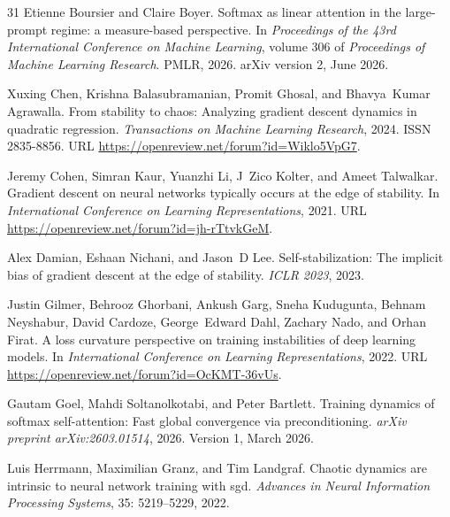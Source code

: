 \documentclass[11pt]{article}
\begin{document}
\begin{thebibliography}{31}
Etienne Boursier and Claire Boyer.
\newblock Softmax as linear attention in the large-prompt regime: a
  measure-based perspective.
\newblock In \emph{Proceedings of the 43rd International Conference on Machine
  Learning}, volume 306 of \emph{Proceedings of Machine Learning Research}.
  PMLR, 2026.
\newblock arXiv version 2, June 2026.

Xuxing Chen, Krishna Balasubramanian, Promit Ghosal, and Bhavya~Kumar
  Agrawalla.
\newblock From stability to chaos: Analyzing gradient descent dynamics in
  quadratic regression.
\newblock \emph{Transactions on Machine Learning Research}, 2024.
\newblock ISSN 2835-8856.
\newblock URL \url{https://openreview.net/forum?id=Wiklo5VpG7}.

Jeremy Cohen, Simran Kaur, Yuanzhi Li, J~Zico Kolter, and Ameet Talwalkar.
\newblock Gradient descent on neural networks typically occurs at the edge of
  stability.
\newblock In \emph{International Conference on Learning Representations}, 2021.
\newblock URL \url{https://openreview.net/forum?id=jh-rTtvkGeM}.

Alex Damian, Eshaan Nichani, and Jason~D Lee.
\newblock Self-stabilization: The implicit bias of gradient descent at the edge
  of stability.
\newblock \emph{ICLR 2023}, 2023.

Justin Gilmer, Behrooz Ghorbani, Ankush Garg, Sneha Kudugunta, Behnam
  Neyshabur, David Cardoze, George~Edward Dahl, Zachary Nado, and Orhan Firat.
\newblock A loss curvature perspective on training instabilities of deep
  learning models.
\newblock In \emph{International Conference on Learning Representations}, 2022.
\newblock URL \url{https://openreview.net/forum?id=OcKMT-36vUs}.

Gautam Goel, Mahdi Soltanolkotabi, and Peter Bartlett.
\newblock Training dynamics of softmax self-attention: Fast global convergence
  via preconditioning.
\newblock \emph{arXiv preprint arXiv:2603.01514}, 2026.
\newblock Version 1, March 2026.

Luis Herrmann, Maximilian Granz, and Tim Landgraf.
\newblock Chaotic dynamics are intrinsic to neural network training with sgd.
\newblock \emph{Advances in Neural Information Processing Systems},
  35: 5219--5229, 2022.


\end{thebibliography}
\end{document}
